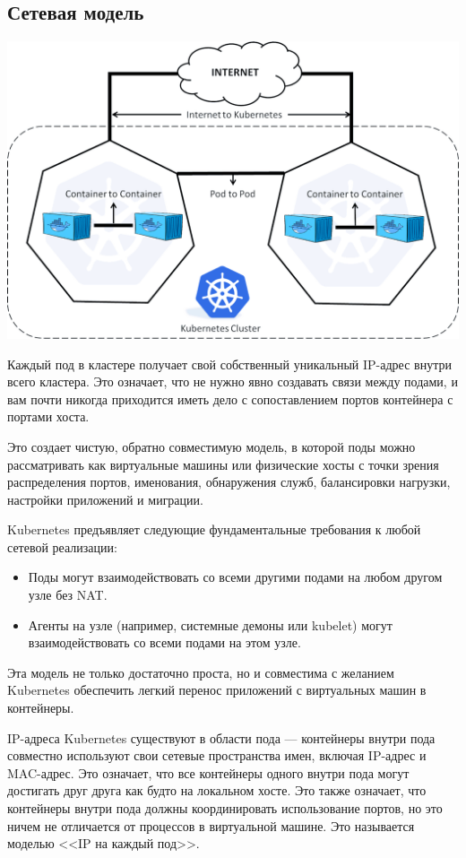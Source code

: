 \documentclass[a4page]{article}
\begin{document}
\subsection{Сетевая модель}
\includegraphics[width=450pt]{kubernetes-Networking-Model.png}

Каждый под в кластере получает свой собственный уникальный IP-адрес внутри всего кластера. Это означает, что не нужно явно создавать связи между подами, и вам почти никогда приходится иметь дело с сопоставлением портов контейнера с портами хоста\cite{k8s:network-model}.

Это создает чистую, обратно совместимую модель, в которой поды можно рассматривать как виртуальные машины или физические хосты с точки зрения распределения портов, именования, обнаружения служб, балансировки нагрузки, настройки приложений и миграции.

Kubernetes предъявляет следующие фундаментальные требования к любой сетевой реализации:
\begin{itemize}
  \item Поды могут взаимодействовать со всеми другими подами на любом другом узле без NAT.
  \item Агенты на узле (например, системные демоны или kubelet) могут \\взаимодействовать со всеми подами на этом узле.
\end{itemize}

Эта модель не только достаточно проста, но и совместима с желанием Kubernetes обеспечить легкий перенос приложений с виртуальных машин в контейнеры.

IP-адреса Kubernetes существуют в области пода --- контейнеры внутри пода совместно используют свои сетевые пространства имен, включая IP-адрес и MAC-адрес. Это означает, что все контейнеры одного внутри пода могут достигать друг друга как будто на локальном хосте. Это также означает, что контейнеры внутри пода должны координировать использование портов, но это ничем не отличается от процессов в виртуальной машине. Это называется моделью <<IP на каждый под>>.
\end{document}
